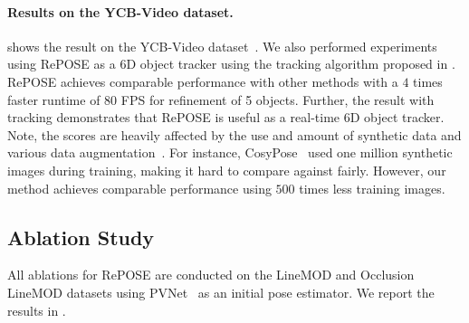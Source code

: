 \documentclass[10pt,twocolumn,letterpaper]{article}
\begin{document}
\paragraph{Results on the YCB-Video dataset.}
 shows the result on the YCB-Video dataset~\cite{xiang2018posecnn}. We also performed experiments using RePOSE as a 6D object tracker using the tracking algorithm proposed in \cite{li2018deepim}. RePOSE achieves comparable performance with other methods with a $4$ times faster runtime of $80$ FPS for refinement of 5 objects. Further, the result with tracking demonstrates that RePOSE is useful as a real-time 6D object tracker. Note, the scores are heavily affected by the use and amount of synthetic data and various data augmentation~\cite{labbe2020}. For instance, CosyPose~\cite{labbe2020} used one million synthetic images during training, making it hard to compare against fairly. However, our method achieves comparable performance using $500$ times less training images.

\subsection{Ablation Study}
All ablations for RePOSE are conducted on the LineMOD and Occlusion LineMOD datasets using PVNet~\cite{peng2019pvnet} as an initial pose estimator. We report the results in .
\end{document}
